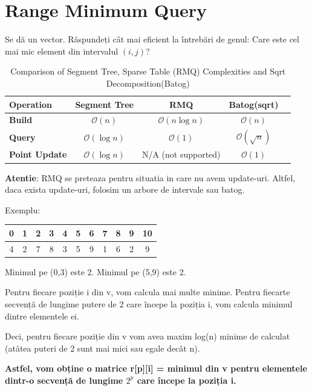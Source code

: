 \documentclass[11pt,a4paper]{article}
\theoremstyle{definition}
\theoremstyle{plain}
\theoremstyle{remark}
\begin{document}
\section{Range Minimum Query}
Se dă un vector. Răspundeți cât mai eficient la întrebări de genul: Care este cel mai mic element din intervalul $(i, j)$?

\begin{table}[h!]
\centering
\label{tab:ds_comparison}
\begin{tabular}{lcccc}
    \toprule
    \textbf{Operation} & \textbf{Segment Tree} & \textbf{RMQ} & \textbf{Batog(sqrt)} \\
    \midrule
    \textbf{Build} & $\mathcal{O}(n)$ & $\mathcal{O}(n \log n)$ & $\mathcal{O}(n)$ \\
    \textbf{Query} & $\mathcal{O}(\log n)$ & $\mathcal{O}(1)$ & $\mathcal{O}(\sqrt{n})$  \\
    \textbf{Point Update} & $\mathcal{O}(\log n)$ & N/A (not supported) & $\mathcal{O}(1)$ \\
    \bottomrule
\end{tabular}
\caption{Comparison of Segment Tree, Sparse Table (RMQ) Complexities and Sqrt Decomposition(Batog)}
\end{table}

\textbf{Atentie}: RMQ se preteaza pentru situatia in care nu avem update-uri. Altfel, daca exista update-uri, folosim un arbore de intervale sau batog.

Exemplu:

\bigskip
\begin{tabular}{|c|c|c|c|c|c|c|c|c|c|c|}
\hline
0 & 1 & 2 & 3 & 4 & 5 & 6 & 7 & 8 & 9 & 10\\
\hline
4 & 2 & 7 & 8 & 3 & 5 & 9 & 1 & 6 & 2 & 9 \\
\hline
\end{tabular}
\bigskip

Minimul pe (0,3) este 2. Minimul pe (5,9) este 2.

Pentru fiecare poziție i din v, vom calcula mai multe minime. Pentru fiecarte secvență de lungime putere de 2 care începe la poziția i, vom calcula minimul dintre elementele ei.

Deci, pentru fiecare poziție din v vom avea maxim log(n) minime de calculat (atâtea puteri de 2 sunt mai mici sau egale decât n).

\textbf{Astfel, vom obține o matrice r[p][i] = minimul din v pentru elementele dintr-o secvență de lungime $2^p$ care începe la poziția i.}
\end{document}
